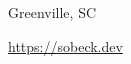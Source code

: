 \documentclass{moderncv}
\begin{document}
	
	\makecvtitle
	
	Greenville, SC
	
	\url{https://sobeck.dev}

	\noindent\makebox[\linewidth]{\rule{\paperwidth}{0.4pt}}
\end{document}
